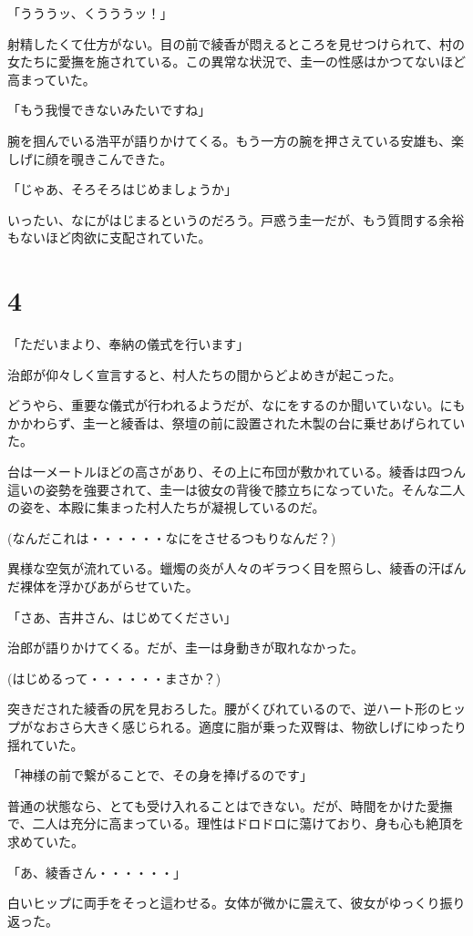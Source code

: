 ﻿\documentclass[book,tate]{jlreq}
\begin{document}
「うううッ、くうううッ！」

射精したくて仕方がない。目の前で綾香が悶えるところを見せつけられて、村の女たちに愛撫を施されている。この異常な状況で、圭一の性感はかつてないほど高まっていた。

「もう我慢できないみたいですね」

腕を掴んでいる浩平が語りかけてくる。もう一方の腕を押さえている安雄も、楽しげに顔を覗きこんできた。

「じゃあ、そろそろはじめましょうか」

いったい、なにがはじまるというのだろう。戸惑う圭一だが、もう質問する余裕もないほど肉欲に支配されていた。

\section*{4}

「ただいまより、奉納の儀式を行います」

治郎が仰々しく宣言すると、村人たちの間からどよめきが起こった。

どうやら、重要な儀式が行われるようだが、なにをするのか聞いていない。にもかかわらず、圭一と綾香は、祭壇の前に設置された木製の台に乗せあげられていた。

台は一メートルほどの高さがあり、その上に布団が敷かれている。綾香は四つん這いの姿勢を強要されて、圭一は彼女の背後で膝立ちになっていた。そんな二人の姿を、本殿に集まった村人たちが凝視しているのだ。

(なんだこれは・・・・・・なにをさせるつもりなんだ？)

異様な空気が流れている。蠟燭の炎が人々のギラつく目を照らし、綾香の汗ばんだ裸体を浮かびあがらせていた。

「さあ、吉井さん、はじめてください」

治郎が語りかけてくる。だが、圭一は身動きが取れなかった。

(はじめるって・・・・・・まさか？)

突きだされた綾香の尻を見おろした。腰がくびれているので、逆ハート形のヒップがなおさら大きく感じられる。適度に脂が乗った双臀は、物欲しげにゆったり揺れていた。

「神様の前で繋がることで、その身を捧げるのです」

普通の状態なら、とても受け入れることはできない。だが、時間をかけた愛撫で、二人は充分に高まっている。理性はドロドロに蕩けており、身も心も絶頂を求めていた。

「あ、綾香さん・・・・・・」

白いヒップに両手をそっと這わせる。女体が微かに震えて、彼女がゆっくり振り返った。
\end{document}
